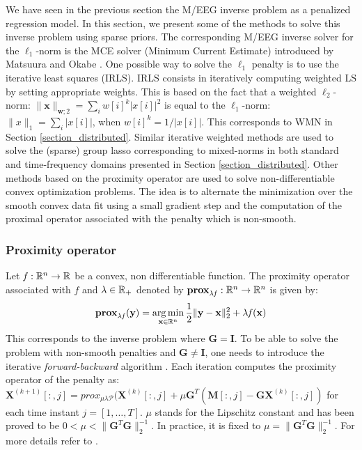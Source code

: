 We have seen in the previous section the M/EEG inverse problem as a penalized regression model. In this section, we present some of the methods to solve this inverse problem using sparse priors. The corresponding M/EEG inverse solver for the $\ell_1$-norm is the MCE solver (Minimum Current Estimate) introduced by Matsuura and Okabe \cite{matsuura1995selective}. One possible way to solve the $\ell_1$ penalty is to use the iterative least squares (IRLS). IRLS consists in iteratively computing weighted LS by setting appropriate weights. This is based on the fact that a weighted $\ell_2$-norm: $\|\mathbf{x}\|_{\mathbf{w};2}=\sum_i w[i]^k |x[i]|^2$ is equal to the $\ell_1$-norm: $\|x\|_1=\sum_i|x[i]|$, when $w[i]^k=1/|x[i]|$. This corresponds to WMN in Section \ref{section_distributed}. Similar iterative weighted methods are used to solve the (sparse) group lasso corresponding to mixed-norms in both standard and time-frequency domains presented in Section \ref{section_distributed}. Other methods based on the proximity operator are used to solve non-differentiable convex optimization problems. The idea is to alternate the minimization over the smooth convex data fit using a small gradient step and the computation of the proximal operator associated with the penalty which is non-smooth.
\adjustwidth{1em}{0pt}
\subsubsection*{Proximity operator}
\vspace{-5pt}
Let $\mathit{f}:\mathbb{R}^n\rightarrow\mathbb{R}$ be a convex, non differentiable function. The proximity operator associated with $\mathit{f}$ and $\lambda\in\mathbb{R}_+$ denoted by
$\textbf{prox}_{\lambda\mathit{f}}:\mathbb{R}^n\rightarrow\mathbb{R}^n$ is given by:
\vspace{-10pt}
\begin{equation}
\textbf{prox}_{\lambda\mathit{f}}(\mathbf{y})=\mathop{\mathrm{arg}\,\mathrm{min}}_{\mathbf{x}\in\mathbb{R}^n}\frac{1}{2}\|\mathbf{y}-\mathbf{x}\|_2^2+\lambda\mathit{f}(\mathbf{x})
\end{equation}
\endadjustwidth
This corresponds to the inverse problem where $\mathbf{G}=\mathbf{I}$. To be able to solve the problem with non-smooth penalties and $\mathbf{G}\neq\mathbf{I}$, one needs to introduce the iterative \textit{forward-backward} algorithm \cite{moreau1965proximite}. Each iteration computes the proximity operator of the penalty as: \\
$\mathbf{X}^{(k+1)}[:,j]=prox_{\mu\lambda\mathcal{P}}(\mathbf{X}^{(k)}[:,j]+\mu\mathbf{G}^T(\mathbf{M}[:,j]-\mathbf{GX}^{(k)}[:,j])$ for each time instant $j=[1,\dots ,T]$. $\mu$ stands for the Lipschitz constant and has been proved to be $0<\mu<\|\mathbf{G}^T\mathbf{G}\|_2^{-1}$. In practice, it is fixed to $\mu=\|\mathbf{G}^T\mathbf{G}\|_2^{-1}$. For more details refer to \cite{moreau1965proximite,combettes2005signal,daubechies2004iterative}.


